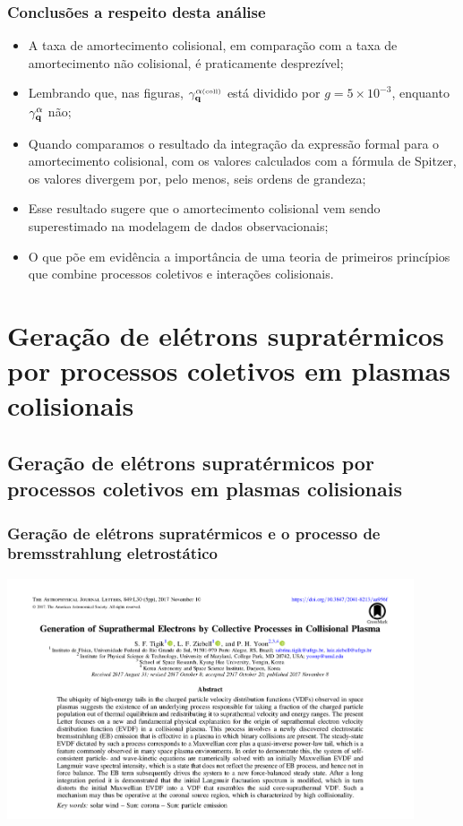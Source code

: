 \documentclass[10pt,aspectratio=1610,lualatex]{beamer}
\begin{document}
\begin{frame}
  \frametitle{Conclusões a respeito desta análise}
  \begin{itemize}
    \item A taxa de amortecimento colisional, em comparação com
    a taxa de amortecimento não colisional, é praticamente desprezível;
    \vspace{0.4cm}
    \pause
    \item Lembrando que, nas figuras, $\gamma_{\bf q}^{\alpha \mbox{\tiny(coll)}}$
    está dividido por  $g=5\times 10^{-3}$, enquanto $\gamma_{\bf q}^\alpha$ não;
    \vspace{0.4cm}
    \pause
    \item Quando comparamos o resultado da integração da expressão formal
    para o amortecimento colisional, com os valores calculados com a
    fórmula de Spitzer, os valores divergem por, pelo menos, seis ordens
    de grandeza;
    \vspace{0.4cm}
    \pause
    \item Esse resultado sugere que o amortecimento colisional
    vem sendo superestimado na modelagem de dados observacionais;
    \vspace{0.4cm}
    \pause
    \item O que põe em evidência a importância de uma teoria de primeiros
    princípios que combine processos coletivos e interações colisionais.
  \end{itemize}
\end{frame}

\section*{Geração de elétrons supratérmicos por processos
  coletivos em plasmas colisionais}
\subsection{Geração de elétrons supratérmicos por processos
  coletivos em plasmas colisionais}
\begin{frame}
  \frametitle{Geração de elétrons supratérmicos e o processo de
    bremsstrahlung eletrostático}
 \centering \includegraphics[width=0.9\textwidth]{print_Tigik2017a.png}
\end{frame}
\end{document}
